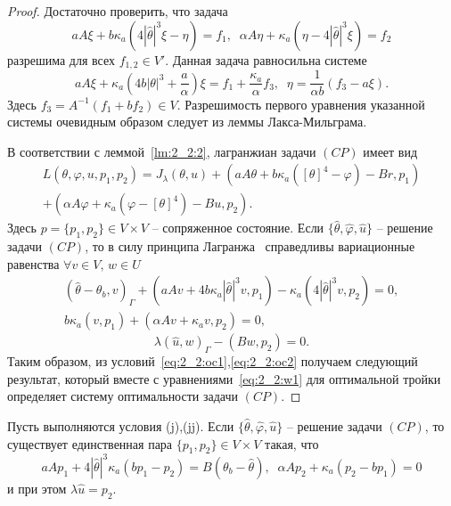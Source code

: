 \begin{proof}
    Достаточно проверить, что задача
    \[
        aA \xi + b \kappa_a (4|\hat{\theta}|^3 \xi - \eta) = f_1, \; \;
        \alpha A \eta + \kappa_a (\eta - 4|\hat{\theta}|^3 \xi) = f_2
    \]
    разрешима для всех $f_{1,2}\in V'.$ Данная задача равносильна системе
    \[
        aA\xi + \kappa_a\left(4b|\theta|^3 + \frac{a}{\alpha}\right) \xi = f_1
        +\frac{\kappa_a}{\alpha}f_3, \; \;
        \eta =\frac{1}{\alpha b}( f_3-a\xi).
    \]
    Здесь $f_3=A^{-1}(f_1+bf_2)\in V.$ Разрешимость первого уравнения указанной
    системы очевидным образом следует из леммы Лакса-Мильграма.


    В соответствии с леммой~\ref{lm:2_2:2}, лагранжиан задачи $(CP)$ имеет вид
    \begin{gather*}
        L(\theta, \varphi, u, p_1, p_2) = J_\lambda(\theta, u)
        + (aA\theta + b\kappa_a([\theta]^4 - \varphi) - Br, p_1) \\
        + (\alpha A \varphi + \kappa_a(\varphi - [\theta]^4) - Bu, p_2).
    \end{gather*}
    Здесь $p=\{p_1,p_2\}\in V\times V$ -- сопряженное состояние.
    Если $\{\hat{\theta}, \hat{\varphi}, \hat{u} \}$ -- решение задачи $(CP)$, то
    в силу принципа Лагранжа~\cite[Гл. 2, теорема 1.5]{10} справедливы вариационные равенства
    $\forall v\in V,\, w\in U$
    \begin{equation}
        \label{eq:2_2:oc1}
        \begin{gathered}
        (\hat{\theta} -\theta_b, v)
            _\Gamma + (aAv + 4 b\kappa_a |\hat{\theta}|^3 v, p_1)
            - \kappa_a ( 4 |\hat{\theta}|^3 v, p_2) = 0,\\
            b \kappa_a (v, p_1)+ (\alpha A v + \kappa_a v, p_2) = 0,
        \end{gathered}
    \end{equation}
    \begin{equation}
        \label{eq:2_2:oc2}
        \lambda(\hat{u},w)_\Gamma - (Bw, p_2) = 0.
    \end{equation}
    Таким образом, из условий~\eqref{eq:2_2:oc1},\eqref{eq:2_2:oc2}
    получаем следующий результат, который вместе с уравнениями~\eqref{eq:2_2:w1}
    для оптимальной тройки определяет систему оптимальности задачи $(CP)$.
\end{proof}

\begin{theorem}
    \label{th:2_2:2}
    Пусть выполняются условия (j),(jj).
    Если $\{\hat{\theta}, \hat{\varphi}, \hat{u}\}$ -- решение задачи $(CP)$,
    то существует единственная пара $\{p_1, p_2 \} \in V\times V$ такая, что
    \begin{equation}
        \label{eq:2_2:as}
        aAp_1 +4|\hat{\theta}|^3 \kappa_a(bp_1 - p_2) = B(\theta_b - \hat{\theta}), \;\;
        \alpha A p_2 + \kappa_a (p_2 - b p_1)=0
    \end{equation}
    и при этом $\lambda\hat{u} = p_2$.
\end{theorem}

